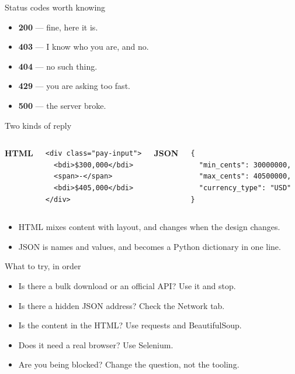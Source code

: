 \documentclass[11pt,aspectratio=169]{beamer}
\newenvironment{wideitemize}
  {\begin{itemize}\setlength{\itemsep}{10pt}}
  {\end{itemize}}
\begin{document}
\begin{frame}{Status codes worth knowing}
\begin{wideitemize}
  \item \textbf{200} --- fine, here it is.
  \item \textbf{403} --- I know who you are, and no.
  \item \textbf{404} --- no such thing.
  \item \textbf{429} --- you are asking too fast.
  \item \textbf{500} --- the server broke.
\end{wideitemize}
\end{frame}

\begin{frame}[fragile]{Two kinds of reply}
\begin{columns}[T,onlytextwidth]
  \textbf{HTML}
\begin{lstlisting}[style=code]
<div class="pay-input">
  <bdi>$300,000</bdi>
  <span>-</span>
  <bdi>$405,000</bdi>
</div>
\end{lstlisting}

  \textbf{JSON}
\begin{lstlisting}[style=code]
{
  "min_cents": 30000000,
  "max_cents": 40500000,
  "currency_type": "USD"
}
\end{lstlisting}
\end{columns}

\vspace{0.8em}
\begin{wideitemize}
  \item HTML mixes content with layout, and changes when the design changes.
  \item JSON is names and values, and becomes a Python dictionary in one line.
\end{wideitemize}
\end{frame}

\begin{frame}{What to try, in order}
\begin{wideitemize}
  \item Is there a bulk download or an official API? Use it and stop.
  \item Is there a hidden JSON address? Check the Network tab.
  \item Is the content in the HTML? Use requests and BeautifulSoup.
  \item Does it need a real browser? Use Selenium.
  \item Are you being blocked? Change the question, not the tooling.
\end{wideitemize}
\end{frame}
\end{document}
